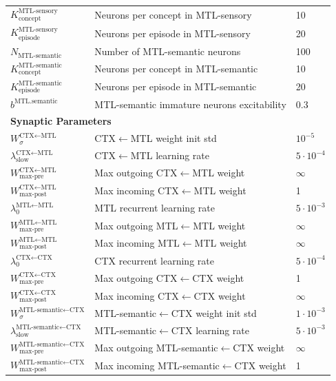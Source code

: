 \documentclass{article}
\begin{document}
\begin{table}[ht]
\begin{tabular}{lp{6cm}l}
$K^\textrm{MTL-sensory}_\textrm{concept}$ & Neurons per concept in MTL-sensory & 10 \\
$K^\textrm{MTL-sensory}_\textrm{episode}$ & Neurons per episode in MTL-sensory & 20 \\
$N_{\text{MTL-semantic}}$ & Number of MTL-semantic neurons & 100 \\
$K^\textrm{MTL-semantic}_\textrm{concept}$ & Neurons per concept in MTL-semantic & 10 \\
$K^\textrm{MTL-semantic}_\textrm{episode}$ & Neurons per episode in MTL-semantic & 20 \\
$b^\text{MTL.semantic}$ & MTL-semantic immature neurons excitability & 0.3 \\
\midrule
\multicolumn{3}{l}{\textbf{Synaptic Parameters}} \\
\midrule
$W_\sigma^{\text{CTX}\leftarrow\text{MTL}}$ & CTX$\leftarrow$MTL weight init std &$10^{-5}$ \\
$\lambda^{\text{CTX}\leftarrow\text{MTL}}_{\textrm{slow}}$ & CTX$\leftarrow$MTL learning rate & $5\cdot 10^{-4}$ \\
$W^{\text{CTX}\leftarrow\text{MTL}}_{\text{max-pre}}$ & Max outgoing CTX$\leftarrow$MTL weight & $\infty$ \\
$W^{\text{CTX}\leftarrow\text{MTL}}_{\text{max-post}}$ & Max incoming CTX$\leftarrow$MTL weight & 1 \\
$\lambda^{\text{MTL}\leftarrow\text{MTL}}_0$ & MTL recurrent learning rate & $5\cdot 10^{-3}$ \\
$W^{\text{MTL}\leftarrow\text{MTL}}_{\text{max-pre}}$ & Max outgoing MTL$\leftarrow$MTL weight & $\infty$ \\
$W^{\text{MTL}\leftarrow\text{MTL}}_{\text{max-post}}$ & Max incoming MTL$\leftarrow$MTL weight & $\infty$ \\
$\lambda^{\text{CTX}\leftarrow\text{CTX}}_0$ & CTX recurrent learning rate & $5\cdot 10^{-4}$ \\
$W^{\text{CTX}\leftarrow\text{CTX}}_{\text{max-pre}}$ & Max outgoing CTX$\leftarrow$CTX weight & 1 \\
$W^{\text{CTX}\leftarrow\text{CTX}}_{\text{max-post}}$ & Max incoming CTX$\leftarrow$CTX weight & $\infty$ \\
$W_\sigma^{\text{MTL-semantic}\leftarrow\text{CTX}}$ & MTL-semantic$\leftarrow$CTX weight init std & $1\cdot 10^{-3}$ \\
$\lambda^{\text{MTL-semantic}\leftarrow\text{CTX}}_{\textrm{slow}}$ & MTL-semantic$\leftarrow$CTX learning rate & $5\cdot 10^{-3}$ \\
$W^{\text{MTL-semantic}\leftarrow\text{CTX}}_{\text{max-pre}}$ & Max outgoing MTL-semantic$\leftarrow$CTX weight & $\infty$ \\
$W^{\text{MTL-semantic}\leftarrow\text{CTX}}_{\text{max-post}}$ & Max incoming MTL-semantic$\leftarrow$CTX weight & 1 \\
\bottomrule
\end{tabular}
\end{table}
\clearpage
\end{document}
